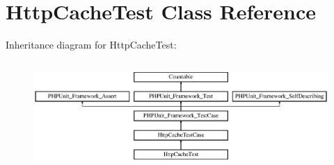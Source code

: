 \section{Http\+Cache\+Test Class Reference}
\label{class_symfony_1_1_component_1_1_http_kernel_1_1_tests_1_1_http_cache_1_1_http_cache_test}
Inheritance diagram for Http\+Cache\+Test\+:\begin{figure}[H]
\begin{center}
\leavevmode
\includegraphics[height=4.129793cm]{class_symfony_1_1_component_1_1_http_kernel_1_1_tests_1_1_http_cache_1_1_http_cache_test}
\end{center}
\end{figure}
